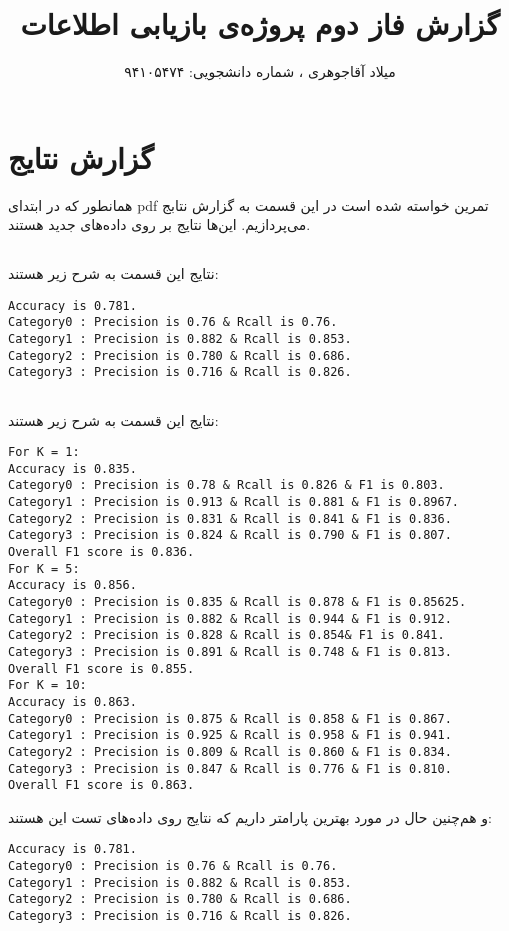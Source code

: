 \documentclass[11pt]{article}
\title{گزارش فاز دوم پروژه‌ی بازیابی اطلاعات}
\author{میلاد آقاجوهری ، شماره دانشجویی: ۹۴۱۰۵۴۷۴\\
}
\begin{document}
\maketitle
\section{گزارش نتایج}
همانطور که در ابتدای pdf تمرین خواسته شده است در این قسمت به گزارش نتابج می‌پردازیم. این‌ها نتایج بر روی داده‌های جدید هستند.
\subsection{}
نتایج این قسمت به شرح زیر هستند:
\begin{latin}
\begin{lstlisting}
Accuracy is 0.781.
Category0 : Precision is 0.76 & Rcall is 0.76.
Category1 : Precision is 0.882 & Rcall is 0.853.
Category2 : Precision is 0.780 & Rcall is 0.686.
Category3 : Precision is 0.716 & Rcall is 0.826.
\end{lstlisting}
\end{latin}

\subsection{}
نتایج این قسمت به شرح زیر هستند:
\begin{latin}
\begin{lstlisting}
For K = 1:
Accuracy is 0.835.
Category0 : Precision is 0.78 & Rcall is 0.826 & F1 is 0.803.
Category1 : Precision is 0.913 & Rcall is 0.881 & F1 is 0.8967.
Category2 : Precision is 0.831 & Rcall is 0.841 & F1 is 0.836.
Category3 : Precision is 0.824 & Rcall is 0.790 & F1 is 0.807.
Overall F1 score is 0.836.
For K = 5:
Accuracy is 0.856.
Category0 : Precision is 0.835 & Rcall is 0.878 & F1 is 0.85625.
Category1 : Precision is 0.882 & Rcall is 0.944 & F1 is 0.912.
Category2 : Precision is 0.828 & Rcall is 0.854& F1 is 0.841.
Category3 : Precision is 0.891 & Rcall is 0.748 & F1 is 0.813.
Overall F1 score is 0.855.
For K = 10:
Accuracy is 0.863.
Category0 : Precision is 0.875 & Rcall is 0.858 & F1 is 0.867.
Category1 : Precision is 0.925 & Rcall is 0.958 & F1 is 0.941.
Category2 : Precision is 0.809 & Rcall is 0.860 & F1 is 0.834.
Category3 : Precision is 0.847 & Rcall is 0.776 & F1 is 0.810.
Overall F1 score is 0.863.
\end{lstlisting}
\end{latin}

و هم‌چنین حال در مورد بهترین پارامتر داریم که نتایج روی داده‌های تست این هستند:
\begin{latin}
\begin{lstlisting}
Accuracy is 0.781.
Category0 : Precision is 0.76 & Rcall is 0.76.
Category1 : Precision is 0.882 & Rcall is 0.853.
Category2 : Precision is 0.780 & Rcall is 0.686.
Category3 : Precision is 0.716 & Rcall is 0.826.
\end{lstlisting}
\end{latin}
\end{document}
